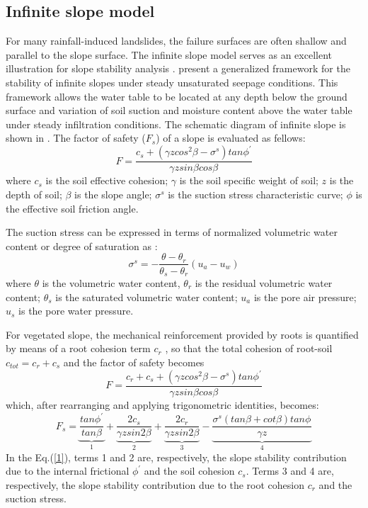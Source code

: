 \subsection{Infinite slope model}

For many rainfall-induced landslides, the failure surfaces are often shallow and parallel to the slope surface. The infinite slope model serves as an excellent illustration for slope stability analysis \citep{lu2013hill,Cho2002Eva}.
\cite{Lu2008Infinite} present a generalized framework for the stability of infinite slopes under steady unsaturated seepage conditions. This framework allows the water table to be located at any depth below the ground surface and variation of soil suction and moisture content above the water table under steady infiltration conditions. The schematic diagram of infinite slope is shown in . The factor of safety ($F_s$) of a slope is evaluated as fellows:
\begin{equation}F=\frac{c_s+(\gamma z cos^2 \beta - \sigma^s) tan \phi^{'} }{\gamma z sin \beta cos \beta} \end{equation}
where $c_s$ is the soil effective cohesion; $\gamma$ is the soil specific weight of soil; $z$ is the depth of soil; $\beta$ is the slope angle; $\sigma^{s}$ is the suction stress characteristic curve; $\phi$ is the effective soil friction angle.

The suction stress can be expressed in terms of normalized volumetric water content or degree of saturation as \citep{Lu2008Infinite}:
\begin{equation}\sigma^s = -\frac{\theta-\theta_r}{\theta_s-\theta_r}(u_a-u_w)\end{equation}
where $\theta$ is the volumetric water content, $\theta_r$ is the residual volumetric water content; $\theta_s$ is the saturated volumetric water content; $u_a$ is the pore air pressure; $u_s$ is the pore water pressure.

For vegetated slope, the mechanical reinforcement provided by roots is quantified by means of a root cohesion term $c_r$ \citep{Pollen2007Temporal,Arnone2016Modeling}, so that the total cohesion of root-soil $c_{tot} = c_r+c_s$ and the factor of safety becomes
\begin{equation}F=\frac{c_r+c_s+(\gamma z cos^2 \beta - \sigma^s) tan \phi^{'} }{\gamma z sin \beta cos \beta} \end{equation}
which, after rearranging and applying trigonometric identities, becomes:
\begin{equation}F_s=\underbrace{\frac{tan\phi^{'}}{tan\beta}}_{1}+\underbrace{\frac{2c_s}{\gamma z sin2\beta}}_{2}+\underbrace{\frac{2c_r}{\gamma z sin2\beta}}_{3} 
-\underbrace{\frac{\sigma^s(tan\beta+cot\beta)tan\phi^{}}{\gamma z}}_{4}\label{1}\end{equation}
In the Eq.(\ref{1}), terms 1 and 2 are, respectively, the slope stability contribution due to the internal frictional $\phi^{'}$ and the soil cohesion $c_s$. Terms 3 and 4 are, respectively, the slope stability contribution due to the root cohesion $c_r$ and the suction stress.

